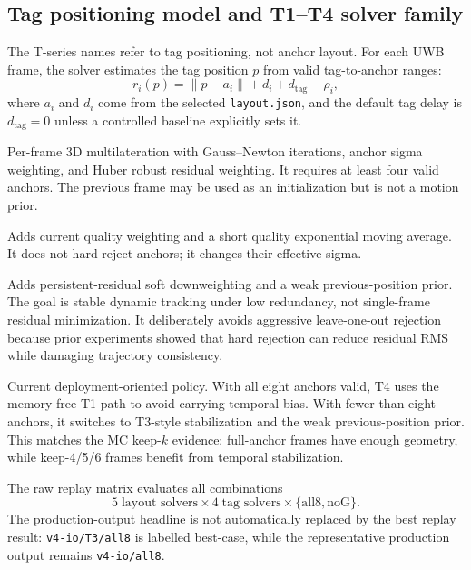 \documentclass[11pt,a4paper]{article}
\begin{document}
\subsection{Tag positioning model and T1--T4 solver family}
\label{sec:tmethod}
The T-series names refer to tag positioning, not anchor layout. For each UWB frame, the
solver estimates the tag position $p$ from valid tag-to-anchor ranges:
\[
  r_i(p) = \lVert p-a_i\rVert + d_i + d_{\text{tag}} - \rho_i,
\]
where $a_i$ and $d_i$ come from the selected \texttt{layout.json}, and the default tag delay
is $d_{\text{tag}}=0$ unless a controlled baseline explicitly sets it.

\begin{description}[leftmargin=2.6em,style=nextline]
  \item[\texttt{T1}: robust WLS multilateration.]
  Per-frame 3D multilateration with Gauss--Newton iterations, anchor sigma weighting, and
  Huber robust residual weighting. It requires at least four valid anchors. The previous
  frame may be used as an initialization but is not a motion prior.

  \item[\texttt{T2}: quality-aware robust WLS.]
  Adds current quality weighting and a short quality exponential moving average. It does
  not hard-reject anchors; it changes their effective sigma.

  \item[\texttt{T3}: dynamic-stable robust WLS.]
  Adds persistent-residual soft downweighting and a weak previous-position prior. The goal
  is stable dynamic tracking under low redundancy, not single-frame residual minimization.
  It deliberately avoids aggressive leave-one-out rejection because prior experiments showed
  that hard rejection can reduce residual RMS while damaging trajectory consistency.

  \item[\texttt{T4}: adaptive redundancy policy.]
  Current deployment-oriented policy. With all eight anchors valid, T4 uses the memory-free
  T1 path to avoid carrying temporal bias. With fewer than eight anchors, it switches to
  T3-style stabilization and the weak previous-position prior. This matches the MC keep-$k$
  evidence: full-anchor frames have enough geometry, while keep-4/5/6 frames benefit from
  temporal stabilization.
\end{description}

The raw replay matrix evaluates all combinations
\[
  5\;\text{layout solvers}\times4\;\text{tag solvers}\times\{\text{all8},\text{noG}\}.
\]
The production-output headline is not automatically replaced by the best replay result:
\texttt{v4-io/T3/all8} is labelled best-case, while the representative production output
remains \texttt{v4-io/all8}.
\end{document}
